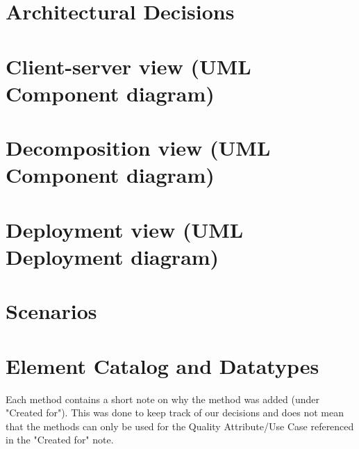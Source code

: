 \documentclass[english]{sareport}
\begin{document}
\maketitle

\tableofcontents
\dominilof
\fakelistoffigures


\chapter{Architectural Decisions}\label{ch:overview}
    
    \clearpage

\chapter{Client-server view (UML Component diagram)}\label{ch:client-server}
    \minilof
    
    \clearpage

\chapter{Decomposition view (UML Component diagram)}\label{ch:decomposition}
    \minilof
    
    \clearpage

\chapter{Deployment view (UML Deployment diagram)}\label{ch:deployment}
    \minilof
    
    \clearpage

\chapter{Scenarios}\label{ch:scenarios}
    \minilof
    

\chapter{Element Catalog and Datatypes}\label{ch:elements-datatypes}
    Each method contains a short note on why the method was added (under "Created for").
    This was done to keep track of our decisions and does not mean that the methods can only
    be used for the Quality Attribute/Use Case referenced in the "Created for" note.

\end{document}
